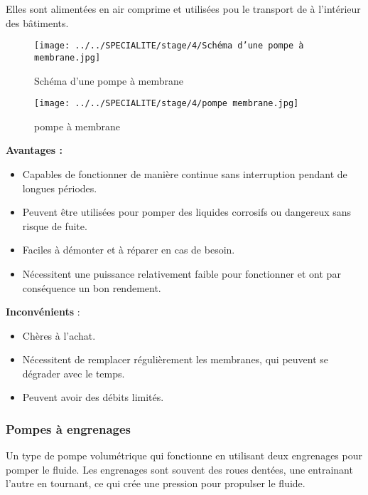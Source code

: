 \documentclass[20pt,a4paper]{report}
\begin{document}
\begin{large}
Elles sont alimentées en air comprime et utilisées pou le transport de             à l’intérieur des bâtiments.
 
					\begin{figure}[h]
					\centering
					\texttt{[image: ../../SPECIALITE/stage/4/Schéma d'une pompe à membrane.jpg]}
					\caption{Schéma d'une pompe à membrane}
					\end{figure}
					
					\begin{figure}[!h]
					\centering
					\texttt{[image: ../../SPECIALITE/stage/4/pompe membrane.jpg]} 		
					\caption{pompe à membrane}
					\end{figure}
										 
\textbf{Avantages :}	
\begin{itemize}
\item Capables de fonctionner de manière continue sans interruption pendant de longues périodes.

	\item Peuvent être utilisées pour pomper des liquides corrosifs ou dangereux sans risque de fuite.
	
	\item Faciles à démonter et à réparer en cas de besoin.
	
	\item Nécessitent une puissance relativement faible pour fonctionner et ont par conséquence un bon rendement.
\end{itemize}

\textbf{Inconvénients }:
\begin{itemize}
	\item Chères à l’achat.
	
	\item Nécessitent de remplacer régulièrement les membranes, qui peuvent se dégrader avec le temps.
	
	\item Peuvent avoir des débits limités.
\end{itemize}

				\subsubsection{Pompes à engrenages }
Un type de pompe volumétrique qui fonctionne en utilisant deux engrenages pour pomper le fluide. Les engrenages sont souvent des roues dentées, une entrainant l’autre en tournant, ce qui crée une pression pour propulser le fluide.


\end{large}
\end{document}
